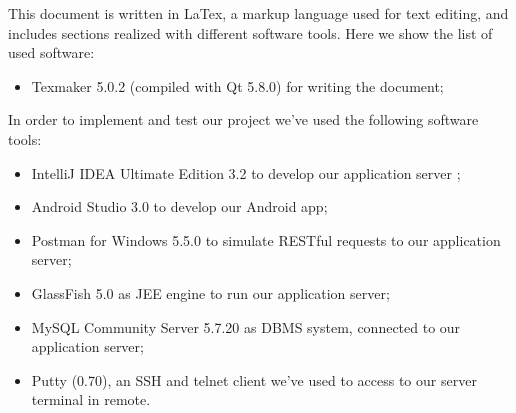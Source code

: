 This document is written in LaTex, a markup language used for text editing, and includes sections realized with different software tools. Here we show the list of used software:
\begin{itemize}
	\item Texmaker 5.0.2 (compiled with Qt 5.8.0) for writing the document;
\end{itemize}
In order to implement and test our project we've used the following software tools:
\begin{itemize}
	\item IntelliJ IDEA Ultimate Edition 3.2 to develop our application server ;
	\item Android Studio 3.0 to develop our Android app;
	\item Postman for Windows 5.5.0 to simulate RESTful requests to our application server;
	\item GlassFish 5.0 as JEE engine to run our application server;
	\item MySQL Community Server 5.7.20 as DBMS system, connected to our application server;
	\item Putty (0.70), an SSH and telnet client we've used to access to our server terminal in remote.
\end{itemize}